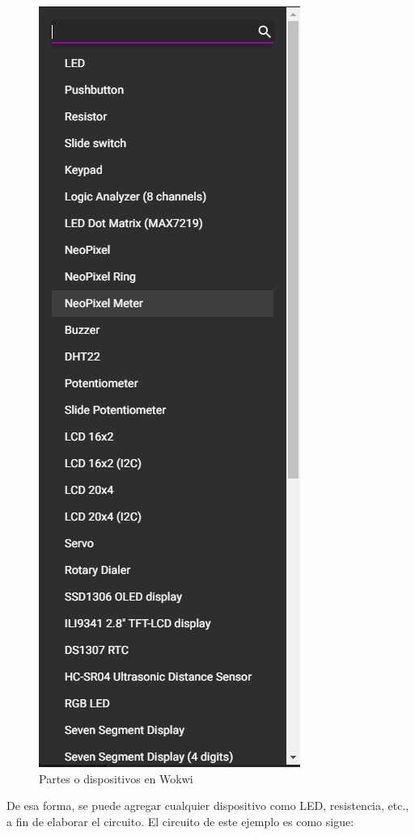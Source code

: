 \documentclass{article}
\begin{document}
    \begin{figure}[H]
        \centering
        \includegraphics[width=0.2\paperwidth]{images/wokwi-parts}
        \caption{Partes o dispositivos en Wokwi}
    \end{figure}

    De esa forma, se puede agregar cualquier dispositivo como LED,
    resistencia, etc., a fin de elaborar el circuito. El circuito de este
    ejemplo es como sigue:
\end{document}
